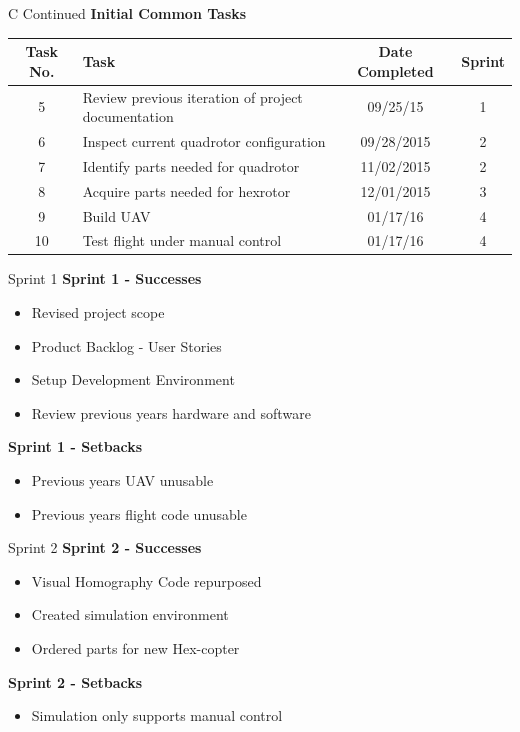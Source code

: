 \documentclass[11pt]{beamer}
\begin{document}
\begin{frame}{C Continued}
\textbf{Initial Common Tasks}
\begin{tabular}{| c | >{\raggedright}m{4cm} | c | c |}\hline
Task No. & Task & Date Completed & Sprint\\\hline
5 & Review previous iteration of project documentation & 09/25/15 & 1 \\\hline
6 & Inspect current quadrotor configuration & 09/28/2015 & 2\\\hline
7 & Identify parts needed for quadrotor & 11/02/2015 & 2 \\\hline
8 & Acquire parts needed for hexrotor & 12/01/2015 & 3 \\\hline
9 & Build UAV & 01/17/16 & 4 \\\hline
10 & Test flight under manual control & 01/17/16 & 4 \\\hline
\end{tabular}
\end{frame}


 \begin{frame}{Sprint 1}
	\large{\textbf{Sprint 1 - Successes}}
\begin{itemize}
	\item Revised project scope
	\item Product Backlog - User Stories
	\item Setup Development Environment
	\item Review previous years hardware and software
\end{itemize}

	\large{\textbf{Sprint 1 - Setbacks}}
	\begin{itemize}
		\item Previous years UAV unusable
		\item Previous years flight code unusable
	\end{itemize}
 \end{frame}
 
 
 \begin{frame}{Sprint 2}
	\large{\textbf{Sprint 2 - Successes}}
	\begin{itemize}
		\item Visual Homography Code repurposed
		\item Created simulation environment
		\item Ordered parts for new Hex-copter
	\end{itemize}
	\large{\textbf{Sprint 2 - Setbacks}}
	\begin{itemize}
		\item Simulation only supports manual control
	\end{itemize}
 \end{frame}
 
\end{document}
